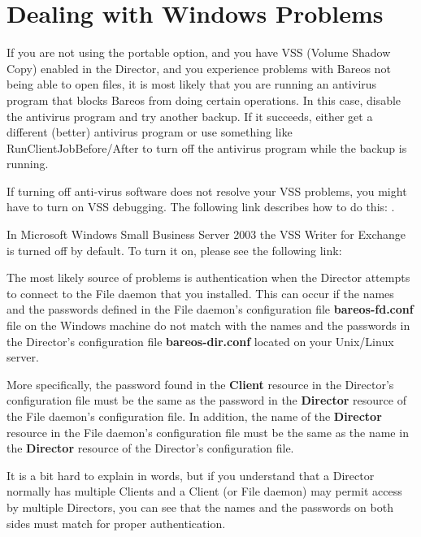 \section{Dealing with Windows Problems}
\label{problems}

If you are not using the portable option, and you have VSS
(Volume Shadow Copy) enabled in the Director, and you experience
problems with Bareos not being able to open files, it is most
likely that you are running an antivirus program that blocks
Bareos from doing certain operations. In this case, disable the
antivirus program and try another backup.  If it succeeds, either
get a different (better) antivirus program or use something like
RunClientJobBefore/After to turn off the antivirus program while
the backup is running.

If turning off anti-virus software does not resolve your VSS
problems, you might have to turn on VSS debugging.  The following
link describes how to do this:
.

In Microsoft Windows Small Business Server 2003 the VSS Writer for Exchange
is turned off by default. To turn it on, please see the following link:


The most likely source of problems is authentication when the Director
attempts to connect to the File daemon that you installed. This can occur if
the names and the passwords defined in the File daemon's configuration file
{\bf bareos-fd.conf} file on
the Windows machine do not match with the names and the passwords in the
Director's configuration file {\bf bareos-dir.conf} located on your Unix/Linux
server.

More specifically, the password found in the {\bf Client} resource in the
Director's configuration file must be the same as the password in the {\bf
Director} resource of the File daemon's configuration file. In addition, the
name of the {\bf Director} resource in the File daemon's configuration file
must be the same as the name in the {\bf Director} resource of the Director's
configuration file.

It is a bit hard to explain in words, but if you understand that a Director
normally has multiple Clients and a Client (or File daemon) may permit access
by multiple Directors, you can see that the names and the passwords on both
sides must match for proper authentication.


